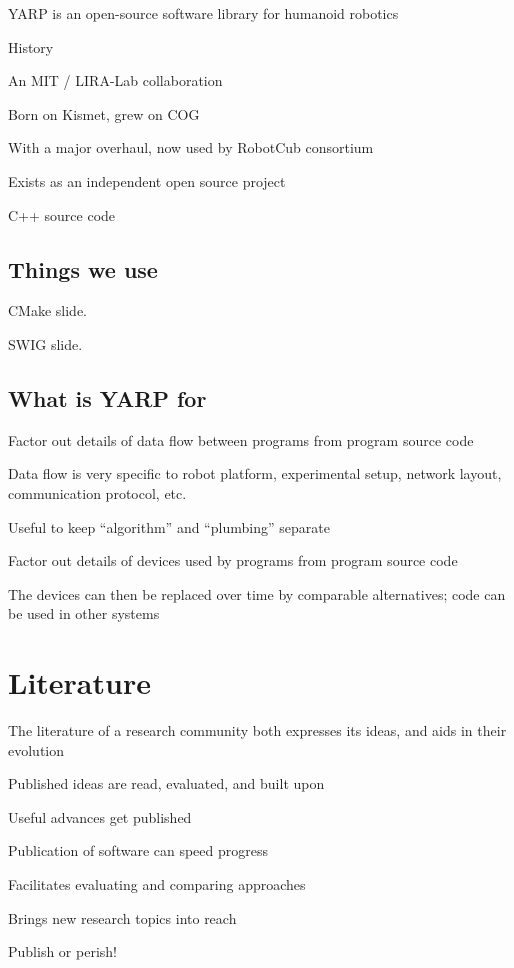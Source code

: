 YARP is an open-source software library  for humanoid robotics

History

An MIT / LIRA-Lab collaboration

Born on Kismet, grew on COG

With a major overhaul, now used by RobotCub consortium

Exists as an independent open source project

C++ source code


\subsection{Things we use}

CMake slide.

SWIG slide.


\subsection{What is YARP for}


Factor out details of data flow between programs from program source code

Data flow is very specific to robot platform, experimental setup,
network layout, communication protocol, etc.

Useful to keep ``algorithm'' and ``plumbing'' separate

Factor out details of devices used by programs from program source code

The devices can then be replaced over time by comparable alternatives;
code can be used in other systems


\section{Literature}

The literature of a research community both expresses its ideas, and
aids in their evolution

Published ideas are read, evaluated, and built upon

Useful advances get published

Publication of software can speed progress

Facilitates evaluating and comparing approaches

Brings new research topics into reach

Publish or perish!


